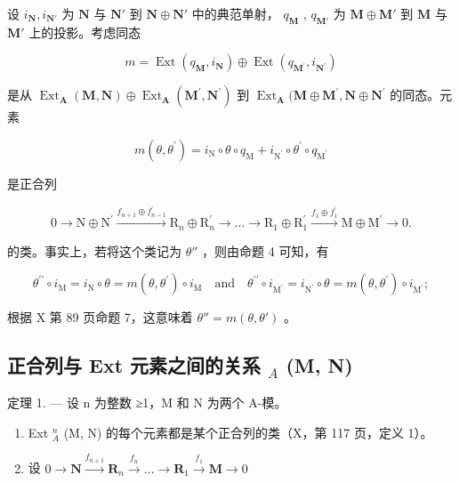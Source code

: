 设 \(i_{\mathbf{N}}, i_{\mathbf{N}'}\) 为 \(\mathbf{N}\) 与 \(\mathbf{N}'\) 到 \(\mathbf{N} \oplus \mathbf{N}'\) 中的典范单射， \(q_{\mathbf{M}}\) , \(q_{\mathbf{M}'}\) 为 \(\mathbf{M} \oplus \mathbf{M}'\) 到 \(\mathbf{M}\) 与 \(\mathbf{M}'\) 上的投影。考虑同态

\[
m = \operatorname{Ext} \left(q _ {\mathbf {M}}, i _ {\mathbf {N}}\right) \oplus \operatorname{Ext} \left(q _ {\mathbf {M} ^ {\prime}}, i _ {\mathbf {N} ^ {\prime}}\right)
\]

是从 \(\operatorname{Ext}_{\mathbf{A}}(\mathbf{M},\mathbf{N})\oplus \operatorname{Ext}_{\mathbf{A}}(\mathbf{M}^{\prime},\mathbf{N}^{\prime})\) 到 \(\operatorname{Ext}_{\mathbf{A}}(\mathbf{M}\oplus \mathbf{M}^{\prime},\mathbf{N}\oplus \mathbf{N}^{\prime}\) 的同态。元素

\[
m (\theta , \theta^ {\prime}) = i _ {\mathrm{N}} \circ \theta \circ q _ {\mathrm{M}} + i _ {\mathrm {N^ {\prime}}} \circ \theta^ {\prime} \circ q _ {\mathrm {M^ {\prime}}}
\]

是正合列

\[
0 \rightarrow \mathrm{N} \oplus \mathrm{N} ^ {\prime} \xrightarrow {f _ {n + 1} \oplus f _ {n - 1} ^ {\prime}} \mathrm{R} _ {n} \oplus \mathrm{R} _ {n} ^ {\prime} \rightarrow \dots \rightarrow \mathrm{R} _ {1} \oplus \mathrm{R} _ {1} ^ {\prime} \xrightarrow {f _ {1} \oplus f _ {1} ^ {\prime}} \mathrm{M} \oplus \mathrm{M} ^ {\prime} \rightarrow 0.
\]

的类。事实上，若将这个类记为 \(\theta''\) ，则由命题 4 可知，有

\[
\theta^ {\prime \prime} \circ i _ {\mathrm{M}} = i _ {\mathrm{N}} \circ \theta = m (\theta , \theta^ {\prime}) \circ i _ {\mathrm{M}} \quad \text {and} \quad \theta^ {\prime \prime} \circ i _ {\mathrm{M} ^ {\prime}} = i _ {\mathrm{N} ^ {\prime}} \circ \theta = m (\theta , \theta^ {\prime}) \circ i _ {\mathrm{M} ^ {\prime}};
\]

根据 X 第 89 页命题 7，这意味着 \(\theta'' = m(\theta, \theta')\) 。

\subsection{\texorpdfstring{正合列与 Ext 元素之间的关系 \(_{A}\) (M, N)}{正合列与 Ext 元素之间的关系 \_\{A\} (M, N)}}

定理 1. --- 设 n 为整数 ≥1，M 和 N 为两个 A-模。

\begin{enumerate}
\def\labelenumi{\alph{enumi})}
\item
  Ext \(_{A}^{n}\) (M, N) 的每个元素都是某个正合列的类（X，第 117 页，定义 1）。
\item
  设 \(0 \to \mathbf{N} \xrightarrow{f_{n+1}} \mathbf{R}_n \xrightarrow{f_n} \ldots \to \mathbf{R}_1 \xrightarrow{f_1} \mathbf{M} \to 0\)
\end{enumerate}

